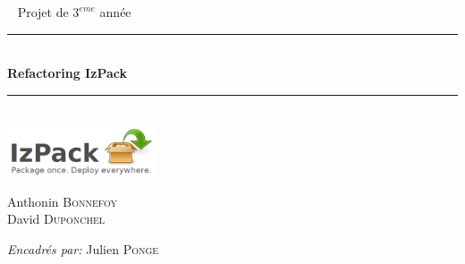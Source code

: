 \begin{frame}[plain]
\begin{center}
~
\vfill
\Large Projet de $3^{eme}$ année\\[1cm]
\hrule
~\\[0.4cm]
{ \Huge \bfseries Refactoring IzPack}\\[0.4cm]
\hrule
~\\[0.4cm]
\includegraphics[height=1.5cm]{../image/izpack-logo-big.png}
\\[0.4cm]
\vfill
\begin{minipage}{0.45\textwidth}
\begin{flushleft} %
\small
Anthonin \textsc{Bonnefoy}\\
David \textsc{Duponchel}\\
\end{flushleft}
\end{minipage}
\begin{minipage}{0.5\textwidth}
\begin{flushright}
\small
\emph{Encadrés par: }Julien \textsc{Ponge}\\
\end{flushright}
\end{minipage}\\[1cm]
\end{center}
\end{frame}